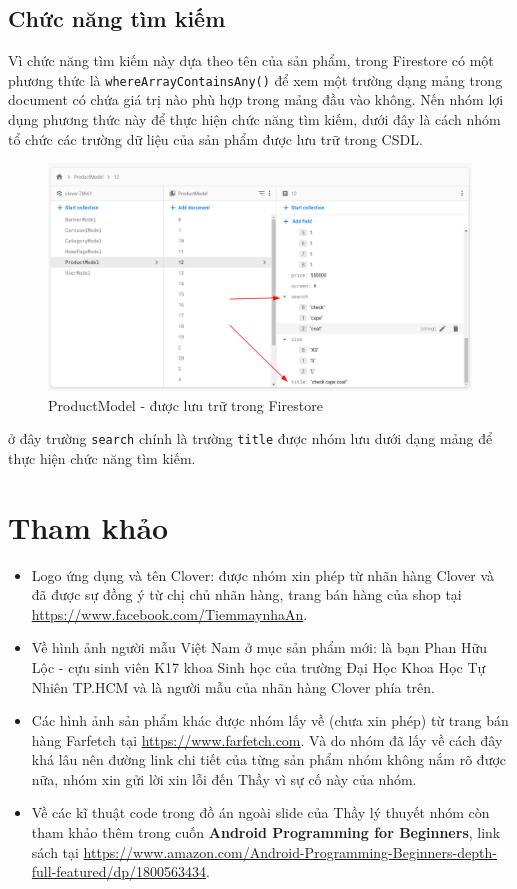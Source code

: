 \documentclass[12pt]{article}
\begin{document}
\subsection{Chức năng tìm kiếm}
Vì chức năng tìm kiếm này dựa theo tên của sản phẩm, trong Firestore có một phương thức là \texttt{whereArrayContainsAny()} để xem một trường dạng mảng trong document có chứa giá trị nào phù hợp trong mảng đầu vào không. Nến nhóm lợi dụng phương thức này để thực hiện chức năng tìm kiếm, dưới đây là cách nhóm tổ chức các trường dữ liệu của sản phẩm được lưu trữ trong CSDL.

\begin{figure}[H]
    \centering
    \includegraphics[width=\textwidth]{images/42.png}
    \caption{ProductModel - được lưu trữ trong Firestore}
\end{figure}

\indent ở đây trường \texttt{search} chính là trường \texttt{title} được nhóm lưu dưới dạng mảng để thực hiện chức năng tìm kiếm.

\section{Tham khảo}
\begin{itemize}
    \item Logo ứng dụng và tên Clover: được nhóm xin phép từ nhãn hàng Clover và đã được sự đồng ý từ chị chủ nhãn hàng, trang bán hàng của shop tại \url{https://www.facebook.com/TiemmaynhaAn}.
    \item Về hình ảnh người mẫu Việt Nam ở mục sản phẩm mới: là bạn Phan Hữu Lộc - cựu sinh viên K17 khoa Sinh học của trường Đại Học Khoa Học Tự Nhiên TP.HCM và là người mẫu của nhãn hàng Clover phía trên.
    \item Các hình ảnh sản phẩm khác được nhóm lấy về (chưa xin phép) từ trang bán hàng Farfetch tại \url{https://www.farfetch.com}. Và do nhóm đã lấy về cách đây khá lâu nên đường link chi tiết của từng sản phẩm nhóm không nắm rõ được nữa, nhóm xin gửi lời xin lỗi đến Thầy vì sự cố này của nhóm.
    \item Về các kĩ thuật code trong đồ án ngoài slide của Thầy lý thuyết nhóm còn tham khảo thêm trong cuốn \textbf{Android Programming for Beginners}, link sách tại \url{https://www.amazon.com/Android-Programming-Beginners-depth-full-featured/dp/1800563434}.
\end{itemize}
\end{document}
